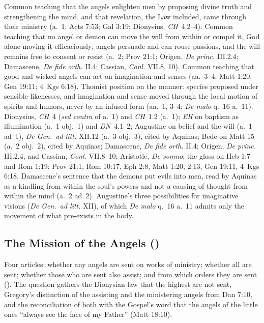  {Common teaching that the angels enlighten men by proposing divine truth
 and strengthening the mind, and that revelation, the Law included, came
 through their ministry (a.~1; Acts 7:53; Gal 3:19; Dionysius, \emph{CH}~4.2--4). Common teaching that no angel or demon can move the will from
 within or compel it, God alone moving it efficaciously; angels persuade
 and can rouse passions, and the will remains free to consent or resist
 (a.~2; Prov 21:1; Origen, \emph{De princ.} III.2.4; Damascene, \emph{De
 fide orth.} II.4; Cassian, \emph{Conl.} VII.8, 10). Common teaching that
 good and wicked angels can act on imagination and senses (aa.~3--4; Matt
 1:20; Gen 19:11; 4~Kgs 6:18). Thomist position on the manner: species
 proposed under sensible likenesses, and imagination and sense moved
 through the local motion of spirits and humors, never by an infused form
 (aa.~1, 3--4; \emph{De malo} q.~16 a.~11).}
 {Dionysius, \emph{CH}~4 (\emph{sed contra} of a.~1) and \emph{CH}~1.2
 (a.~1); \emph{EH} on baptism as illumination (a.~1 obj.~1) and \emph{DN}~4.1--2; Augustine on belief and the will (a.~1 ad~1), \emph{De Gen.\ ad
 litt.} XII.12 (a.~3 obj.~3), cited by Aquinas; Bede on Matt 15 (a.~2
 obj.~2), cited by Aquinas; Damascene, \emph{De fide orth.} II.4; Origen,
 \emph{De princ.} III.2.4, and Cassian, \emph{Conl.} VII.8--10; Aristotle, \emph{De somno}; the gloss on
 Heb 1:7 and Rom 1:19; Prov 21:1, Rom 10:17, Eph 2:8, Matt 1:20, 2:13,
 Gen 19:11, 4~Kgs 6:18.}
 {Damascene's sentence that the demons put evils into men, read by Aquinas
 as a kindling from within the soul's powers and not a causing of thought
 from within the mind (a.~2 ad~2). Augustine's three possibilities for
 imaginative visions (\emph{De Gen.\ ad litt.} XII), of which \emph{De
 malo} q.~16 a.~11 admits only the movement of what pre-exists in the
 body.}

\sectionguard
\subsection{The Mission of the Angels ()}\label{sec:q112}

Four articles: whether any angels are sent on works of ministry; whether
all are sent; whether those who are sent also assist; and from which
orders they are sent (). The question gathers the
Dionysian law that the highest are not sent, Gregory's distinction of the
assisting and the ministering angels from Dan 7:10, and the reconciliation
of both with the Gospel's word that the angels of the little ones ``always
see the face of my Father'' (Matt 18:10).

